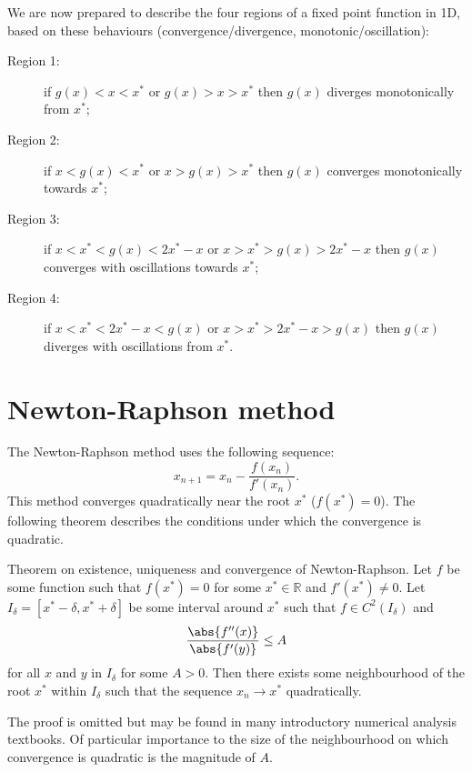 \documentclass{article}
\begin{document}
We are now prepared to describe the four regions of a fixed point function in 1D, based on these behaviours (convergence/divergence, monotonic/oscillation):
\begin{description}
\item[Region 1:] if $g(x) < x < x^*$ or $g(x) > x > x^*$ then $g(x)$ diverges monotonically from $x^*$;
\item[Region 2:] if $x < g(x) < x^*$ or $x > g(x) > x^*$ then $g(x)$ converges monotonically towards $x^*$;
\item[Region 3:] if $x < x^* < g(x) < 2 x^* - x$ or $x > x^* > g(x) > 2 x^* - x$ then $g(x)$ converges with oscillations towards $x^*$;
\item[Region 4:] if $x < x^* < 2 x^* - x < g(x)$ or $x > x^* > 2 x^* - x > g(x)$ then $g(x)$ diverges with oscillations from $x^*$.
\end{description}


\section{Newton-Raphson method}
\label{sec:nrm}

The Newton-Raphson method uses the following sequence:
\begin{equation*}
x_{n+1} = x_n - \frac{f(x_n)}{f'(x_n)} .
\end{equation*}
This method converges quadratically near the root $x^*$ ($f(x^*) = 0$).
The following theorem describes the conditions under which the convergence is quadratic.

\begin{thm}
Theorem on existence, uniqueness and convergence of Newton-Raphson.
Let $f$ be some function such that $f(x^*) = 0$ for some $x^* \in \mathbb{R}$ and $f'(x^*) \neq 0$.
Let $I_\delta = [x^* - \delta, x^* + \delta]$ be some interval around $x^*$ such that $f \in C^2(I_\delta)$ and
\begin{equation*}
\frac{\abs{f''(x)}}{\abs{f'(y)}} \leq A
\end{equation*}
for all $x$ and $y$ in $I_\delta$ for some $A > 0$.
Then there exists some neighbourhood of the root $x^*$ within $I_\delta$ such that the sequence $x_n \to x^*$ quadratically.
\end{thm}

The proof is omitted but may be found in many introductory numerical analysis textbooks.
Of particular importance to the size of the neighbourhood on which convergence is quadratic is the magnitude of $A$.
\end{document}
